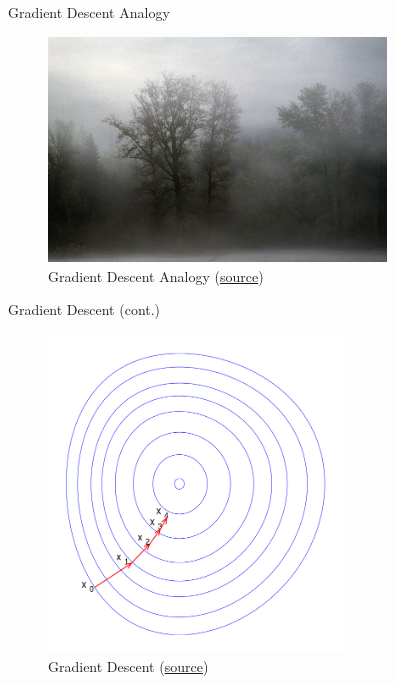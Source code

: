 \documentclass[10pt]{beamer}
\begin{document}
\begin{frame}{Gradient Descent Analogy}

\begin{figure}[h]
\caption{Gradient Descent Analogy (\href{https://en.wikipedia.org/wiki/Gradient_descent}{source})}
\centering
\includegraphics[width=0.8\textwidth]{figs/Okanogan-Wenatchee_National_Forest_morning_fog_shrouds_trees.jpg}
\end{figure}


\end{frame}



\begin{frame}{Gradient Descent (cont.)}

\begin{figure}[h]
\caption{Gradient Descent (\href{https://en.wikipedia.org/wiki/Gradient_descent}{source})}
\centering
\includegraphics[width=0.7\textwidth]{figs/GD.png}
\end{figure}

\end{frame}
\end{document}

